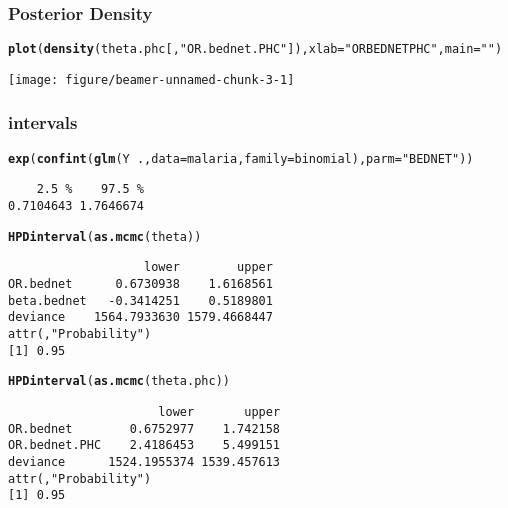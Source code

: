 \documentclass[]{beamer}\usepackage[]{graphicx}\usepackage[]{color}
\makeatletter
\def\maxwidth{ %
  \ifdim\Gin@nat@width>\linewidth
    \linewidth
  \else
    \Gin@nat@width
  \fi
}
\newcommand{\hlstr}[1]{\textcolor[rgb]{0.192,0.494,0.8}{#1}}%
\newcommand{\hlopt}[1]{\textcolor[rgb]{0,0,0}{#1}}%
\newcommand{\hlstd}[1]{\textcolor[rgb]{0.345,0.345,0.345}{#1}}%
\newcommand{\hlkwc}[1]{\textcolor[rgb]{0.333,0.667,0.333}{#1}}%
\newcommand{\hlkwd}[1]{\textcolor[rgb]{0.737,0.353,0.396}{\textbf{#1}}}%
\newenvironment{kframe}{%
 \def\at@end@of@kframe{}%
 \ifinner\ifhmode%
  \def\at@end@of@kframe{\end{minipage}}%
  \begin{minipage}{\columnwidth}%
 \fi\fi%
 \def\FrameCommand##1{\hskip\@totalleftmargin \hskip-\fboxsep
 \colorbox{shadecolor}{##1}\hskip-\fboxsep
     \hskip-\linewidth \hskip-\@totalleftmargin \hskip\columnwidth}%
 \MakeFramed {\advance\hsize-\width
   \@totalleftmargin\z@ \linewidth\hsize
   \@setminipage}}%
 {\par\unskip\endMakeFramed%
 \at@end@of@kframe}
\newenvironment{knitrout}{}{} %
\makeatother
\begin{document}
\begin{frame}[fragile] \frametitle{Posterior Density}
\begin{knitrout}\footnotesize
{}\color{fgcolor}\begin{kframe}
\begin{alltt}
\hlkwd{plot}\hlstd{(}\hlkwd{density}\hlstd{(theta.phc[,}\hlstr{"OR.bednet.PHC"}\hlstd{]),} \hlkwc{xlab}\hlstd{=}\hlstr{"OR BEDNET PHC"}\hlstd{,} \hlkwc{main}\hlstd{=}\hlstr{""}\hlstd{)}
\end{alltt}
\end{kframe}

{\centering \texttt{[image: figure/beamer-unnamed-chunk-3-1]} 

}



\end{knitrout}

\end{frame}
\begin{frame}[fragile] \frametitle{intervals}
\begin{knitrout}\footnotesize
{}\color{fgcolor}\begin{kframe}
\begin{alltt}
\hlkwd{exp}\hlstd{(}\hlkwd{confint}\hlstd{(}\hlkwd{glm}\hlstd{(Y} \hlopt{~} \hlstd{. ,} \hlkwc{data}\hlstd{=malaria,} \hlkwc{family}\hlstd{=binomial),} \hlkwc{parm}\hlstd{=}\hlstr{"BEDNET"}\hlstd{))}
\end{alltt}
\begin{verbatim}
    2.5 %    97.5 % 
0.7104643 1.7646674 
\end{verbatim}
\begin{alltt}
\hlkwd{HPDinterval}\hlstd{(}\hlkwd{as.mcmc}\hlstd{(theta))}
\end{alltt}
\begin{verbatim}
                   lower        upper
OR.bednet      0.6730938    1.6168561
beta.bednet   -0.3414251    0.5189801
deviance    1564.7933630 1579.4668447
attr(,"Probability")
[1] 0.95
\end{verbatim}
\begin{alltt}
\hlkwd{HPDinterval}\hlstd{(}\hlkwd{as.mcmc}\hlstd{(theta.phc))}
\end{alltt}
\begin{verbatim}
                     lower       upper
OR.bednet        0.6752977    1.742158
OR.bednet.PHC    2.4186453    5.499151
deviance      1524.1955374 1539.457613
attr(,"Probability")
[1] 0.95
\end{verbatim}
\end{kframe}
\end{knitrout}
\end{frame}
\end{document}
